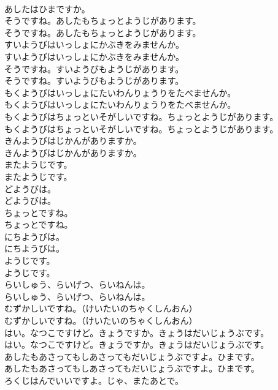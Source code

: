 \documentclass[8pt]{extreport}
\begin{document}
\begin{CJK}{UTF8}{min}
\\	あしたはひまですか。 
\\	そうですね。あしたもちょっとようじがあります。	
\\	そうですね。あしたもちょっとようじがあります。 
\\	すいようびはいっしょにかぶきをみませんか。	
\\	すいようびはいっしょにかぶきをみませんか。 
\\	そうですね。すいようびもようじがあります。	
\\	そうですね。すいようびもようじがあります。 
\\	もくようびはいっしょにたいわんりょうりをたべませんか。	
\\	もくようびはいっしょにたいわんりょうりをたべませんか。 
\\	もくようびはちょっといそがしいですね。ちょっとようじがあります。	
\\	もくようびはちょっといそがしいですね。ちょっとようじがあります。 
\\	きんようびはじかんがありますか。	
\\	きんようびはじかんがありますか。 
\\	またようじです。	
\\	またようじです。 
\\	どようびは。	
\\	どようびは。 
\\	ちょっとですね。	
\\	ちょっとですね。 
\\	にちようびは。	
\\	にちようびは。 
\\	ようじです。	
\\	ようじです。 
\\	らいしゅう、らいげつ、らいねんは。	
\\	らいしゅう、らいげつ、らいねんは。 
\\	むずかしいですね。（けいたいのちゃくしんおん）	
\\	むずかしいですね。（けいたいのちゃくしんおん） 
\\	はい。なつこですけど。きょうですか。きょうはだいじょうぶです。	
\\	はい。なつこですけど。きょうですか。きょうはだいじょうぶです。 
\\	あしたもあさってもしあさってもだいじょうぶですよ。ひまです。	
\\	あしたもあさってもしあさってもだいじょうぶですよ。ひまです。 
\\	ろくじはんでいいですよ。じゃ、またあとで。	

\end{CJK}
\end{document}
